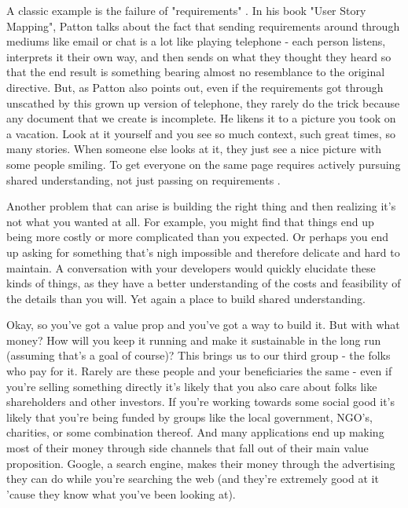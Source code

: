 \documentclass[11pt,a5paper]{book}
\begin{document}
A classic example is the failure of "requirements" \cite{patton}. In his book "User Story Mapping", Patton talks about the fact that sending requirements around through mediums like email or chat is a lot like playing telephone - each person listens, interprets it their own way, and then sends on what they thought they heard so that the end result is something bearing almost no resemblance to the original directive. But, as Patton also points out, even if the requirements got through unscathed by this grown up version of telephone, they rarely do the trick because any document that we create is incomplete. He likens it to a picture you took on a vacation. Look at it yourself and you see so much context, such great times, so many stories. When someone else looks at it, they just see a nice picture with some people smiling. To get everyone on the same page requires actively pursuing shared understanding, not just passing on requirements \cite{patton}.
\newline

Another problem that can arise is building the right thing and then realizing it's not what you wanted at all. For example, you might find that things end up being more costly or more complicated than you expected. Or perhaps you end up asking for something that's nigh impossible and therefore delicate and hard to maintain. A conversation with your developers would quickly elucidate these kinds of things, as they have a better understanding of the costs and feasibility of the details than you will. Yet again a place to build shared understanding.
\newline

Okay, so you've got a value prop and you've got a way to build it. But with what money? How will you keep it running and make it sustainable in the long run (assuming that's a goal of course)? This brings us to our third group - the folks who pay for it. Rarely are these people and your beneficiaries the same - even if you're selling something directly it's likely that you also care about folks like shareholders and other investors. If you're working towards some social good it's likely that you're being funded by groups like the local government, NGO's, charities, or some combination thereof. And many applications end up making most of their money through side channels that fall out of their main value proposition. Google, a search engine, makes their money through the advertising they can do while you're searching the web (and they're extremely good at it 'cause they know what you've been looking at). 
\newline
\end{document}

